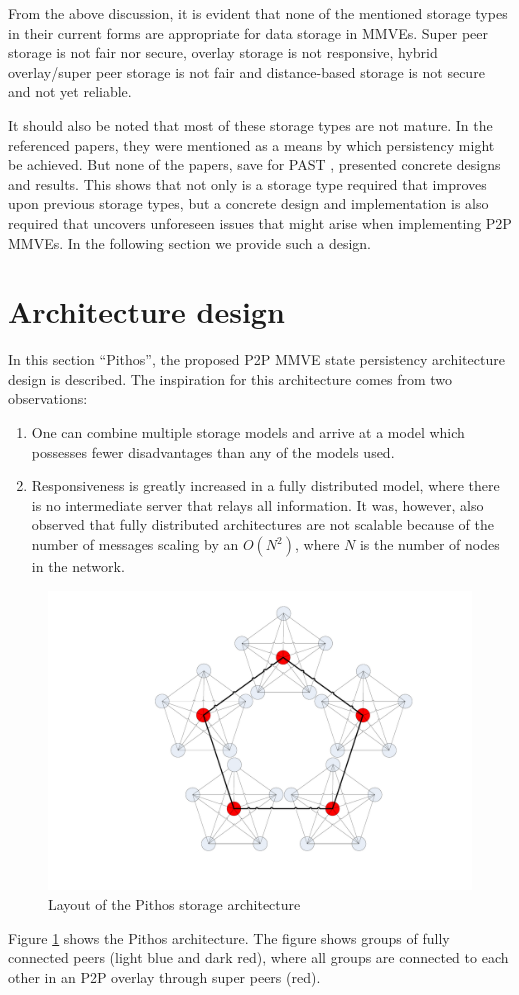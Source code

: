 \documentclass[10pt,a4paper,conference]{IEEEtran}
\begin{document}
From the above discussion, it is evident that none of the mentioned storage types in their current forms are appropriate for data storage in MMVEs.
Super peer storage is not fair nor secure, overlay storage is not responsive, hybrid overlay/super peer storage is not fair and distance-based
storage is not secure and not yet reliable.

It should also be noted that most of these storage types are not mature. In the referenced papers, they were mentioned as a means by which
persistency might be achieved. But none of the papers, save for PAST \cite{storage_and_chaching_PAST}, presented concrete designs and results. This
shows that not only is a storage type required that improves upon previous storage types, but a concrete design and implementation is also required
that uncovers unforeseen issues that might arise when implementing P2P MMVEs. In the following section we provide such a design.

\section{Architecture design}
\label{design}

In this section ``Pithos'', the proposed P2P MMVE state persistency architecture design is described. The inspiration for this architecture comes
from two observations:
%
\begin{enumerate}
  \item One can combine multiple storage models and arrive at a model which possesses fewer disadvantages than any of the models used.
  \item Responsiveness is greatly increased in a fully distributed model, where there is no intermediate server that relays all information. It
      was, however, also observed that fully distributed architectures are not scalable because of the number of messages scaling by an $O(N^2)$,
      where $N$ is the number of nodes in the network.
\end{enumerate}

\begin{figure}[htbp]
 \centering
 \includegraphics[clip=true, viewport=7.5cm 2.5cm 26cm 20cm, width=0.7\columnwidth]{CDHT_layout}
 \caption{Layout of the Pithos storage architecture}
 \label{fig_pithos}
\end{figure}
%
Figure \ref{fig_pithos} shows the Pithos architecture. The figure shows groups of fully connected peers (light blue and dark red), where all groups
are connected to each other in an P2P overlay through super peers (red).
\end{document}

